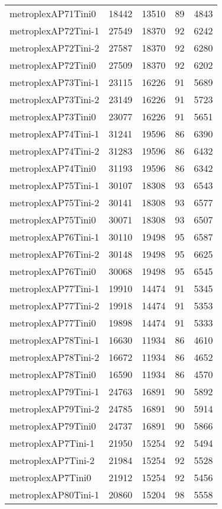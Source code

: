 \begin{longtable}{lrrrr}
metroplexAP71Tini0 & 18442 & 13510 & 89 & 4843 \\
metroplexAP72Tini-1 & 27549 & 18370 & 92 & 6242 \\
metroplexAP72Tini-2 & 27587 & 18370 & 92 & 6280 \\
metroplexAP72Tini0 & 27509 & 18370 & 92 & 6202 \\
metroplexAP73Tini-1 & 23115 & 16226 & 91 & 5689 \\
metroplexAP73Tini-2 & 23149 & 16226 & 91 & 5723 \\
metroplexAP73Tini0 & 23077 & 16226 & 91 & 5651 \\
metroplexAP74Tini-1 & 31241 & 19596 & 86 & 6390 \\
metroplexAP74Tini-2 & 31283 & 19596 & 86 & 6432 \\
metroplexAP74Tini0 & 31193 & 19596 & 86 & 6342 \\
metroplexAP75Tini-1 & 30107 & 18308 & 93 & 6543 \\
metroplexAP75Tini-2 & 30141 & 18308 & 93 & 6577 \\
metroplexAP75Tini0 & 30071 & 18308 & 93 & 6507 \\
metroplexAP76Tini-1 & 30110 & 19498 & 95 & 6587 \\
metroplexAP76Tini-2 & 30148 & 19498 & 95 & 6625 \\
metroplexAP76Tini0 & 30068 & 19498 & 95 & 6545 \\
metroplexAP77Tini-1 & 19910 & 14474 & 91 & 5345 \\
metroplexAP77Tini-2 & 19918 & 14474 & 91 & 5353 \\
metroplexAP77Tini0 & 19898 & 14474 & 91 & 5333 \\
metroplexAP78Tini-1 & 16630 & 11934 & 86 & 4610 \\
metroplexAP78Tini-2 & 16672 & 11934 & 86 & 4652 \\
metroplexAP78Tini0 & 16590 & 11934 & 86 & 4570 \\
metroplexAP79Tini-1 & 24763 & 16891 & 90 & 5892 \\
metroplexAP79Tini-2 & 24785 & 16891 & 90 & 5914 \\
metroplexAP79Tini0 & 24737 & 16891 & 90 & 5866 \\
metroplexAP7Tini-1 & 21950 & 15254 & 92 & 5494 \\
metroplexAP7Tini-2 & 21984 & 15254 & 92 & 5528 \\
metroplexAP7Tini0 & 21912 & 15254 & 92 & 5456 \\
metroplexAP80Tini-1 & 20860 & 15204 & 98 & 5558 \\

\end{longtable}
